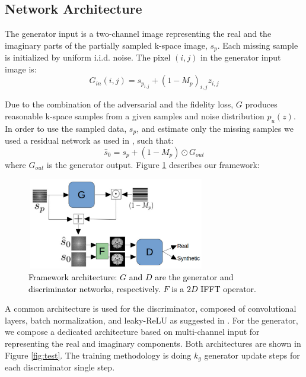 \documentclass[review]{elsarticle}
\begin{document}
\subsection{Network Architecture}

The generator input is a two-channel image representing the real and
the imaginary parts of the partially sampled k-space image, $s_{p}$.
Each missing sample is initialized by uniform i.i.d. noise. The pixel
$\left(i,j\right)$ in the generator input image is: 
\begin{equation}
G_{in}\left(i,j\right)=s_{p_{i,j}}+\left(1-M_{p}\right)_{i,j}z_{i,j}
\end{equation}

Due to the combination of the adversarial and the fidelity loss, $G$
produces reasonable k-space samples from a given samples and noise
distribution $p_{u}\left(z\right)$. In order to use the sampled data,
$s_{p}$, and estimate only the missing samples we used a residual
network \cite{he2016deep} as used in \cite{Oktay2016}, such that:
\begin{equation}
\hat{s}_{0}=s_{p}+\left(1-M_{p}\right)\odot G_{out}
\end{equation}
where $G_{out}$ is the generator output. Figure \ref{fig:system}
describes our framework:

\begin{figure}[H]
	\centering{}\includegraphics[width=7.8cm,height=4cm]{include/grp1/chart}\caption{\label{fig:system} \textcolor{black}{\footnotesize{}{}Framework
			architecture: $G$ and $D$ are the generator and discriminator networks,
			respectively. $F$ is a $2D$ IFFT operator.}}
\end{figure}


A common architecture is used for the discriminator, composed of convolutional
layers, batch normalization, and leaky-ReLU as suggested in \cite{radford2015unsupervised}.
For the generator, we compose a dedicated architecture based on multi-channel
input for representing the real and imaginary components. Both architectures
are shown in Figure \ref{fig:test}.\textbf{ }The training methodology
is doing $k_{g}$ generator update steps for each discriminator single
step.
\end{document}
